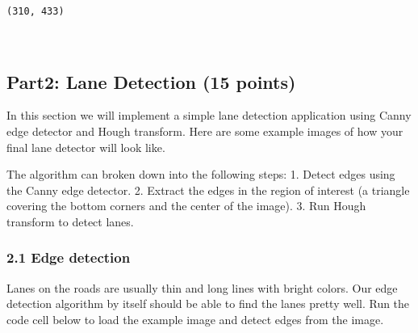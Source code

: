 \documentclass[11pt]{article}
\begin{document}
    \begin{Verbatim}[commandchars=\\\{\}]
(310, 433)

    \end{Verbatim}

    \begin{center}
    \end{center}
    { \hspace*{\fill} \\}
    
    \subsection{Part2: Lane Detection (15
points)}\label{part2-lane-detection-15-points}

In this section we will implement a simple lane detection application
using Canny edge detector and Hough transform. Here are some example
images of how your final lane detector will look like.

The algorithm can broken down into the following steps: 1. Detect edges
using the Canny edge detector. 2. Extract the edges in the region of
interest (a triangle covering the bottom corners and the center of the
image). 3. Run Hough transform to detect lanes.

    \subsubsection{2.1 Edge detection}\label{edge-detection}

Lanes on the roads are usually thin and long lines with bright colors.
Our edge detection algorithm by itself should be able to find the lanes
pretty well. Run the code cell below to load the example image and
detect edges from the image.
\end{document}

